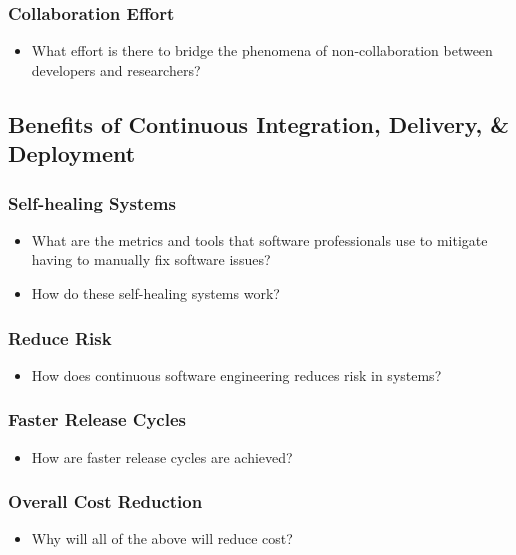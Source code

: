 \documentclass[11pt,a4paper]{article}
\begin{document}
		\subsubsection{Collaboration Effort}
		\begin{itemize}[noitemsep]
			\item What effort is there to bridge the phenomena of non-collaboration between developers and researchers?
		\end{itemize}

	\subsection{Benefits of Continuous Integration, Delivery, \& Deployment}
		\subsubsection{Self-healing Systems}
		\begin{itemize}[noitemsep]
			\item What are the metrics and tools that software professionals use to mitigate having to manually fix software issues?
			\item How do these self-healing systems work?
		\end{itemize}
		\subsubsection{Reduce Risk}
		\begin{itemize}[noitemsep]
			\item How does continuous software engineering reduces risk in systems?
		\end{itemize}
		\subsubsection{Faster Release Cycles}
		\begin{itemize}[noitemsep]
			\item How are faster release cycles are achieved?
		\end{itemize}
		\subsubsection{Overall Cost Reduction}
		\begin{itemize}[noitemsep]
			\item Why will all of the above will reduce cost?
		\end{itemize}
		
\end{document}
